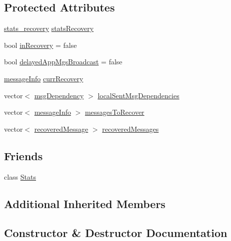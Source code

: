 \subsection*{Protected Attributes}
\begin{DoxyCompactItemize}
\item 
\hyperlink{NodeWithRecovery_8h_a8724f9aa35500c4029d1757428ade746}{stats\+\_\+recovery} \hyperlink{classNodeWithRecovery_abaecd0d1b36ad0305c281905a3465dd6}{stats\+Recovery}
\item 
bool \hyperlink{classNodeWithRecovery_a4e8a29d0f69da296e9971bb5d8882cfb}{in\+Recovery} = false
\item 
bool \hyperlink{classNodeWithRecovery_aae44e6b605047932d21cd5be25671963}{delayed\+App\+Mgs\+Broadcast} = false
\item 
\hyperlink{structures_8h_a7e7bdc1d2fff8a9436f2f352b2711ed6}{message\+Info} \hyperlink{classNodeWithRecovery_a2e574321bd92cb51ef3346168057fe0f}{curr\+Recovery}
\item 
vector$<$ \hyperlink{NodeWithRecovery_8h_a7a7c744666781dbc85c00bb4ccb4a60f}{msg\+Dependency} $>$ \hyperlink{classNodeWithRecovery_a6b143ca2c401bbb2689443091d4d7e17}{local\+Sent\+Msg\+Dependencies}
\item 
vector$<$ \hyperlink{structures_8h_a7e7bdc1d2fff8a9436f2f352b2711ed6}{message\+Info} $>$ \hyperlink{classNodeWithRecovery_a9ed4ac06c68ac579d7848a98b145b5ae}{messages\+To\+Recover}
\item 
vector$<$ \hyperlink{NodeWithRecovery_8h_abc64f7ff8d329883ae93979292b1c996}{recovered\+Message} $>$ \hyperlink{classNodeWithRecovery_adf6b319a727cd9ec43a6cc68cbf99bbb}{recovered\+Messages}
\end{DoxyCompactItemize}
\subsection*{Friends}
\begin{DoxyCompactItemize}
\item 
class \hyperlink{classNodeWithRecovery_a129f65b6976377739eb6231b6962985e}{Stats}
\end{DoxyCompactItemize}
\subsection*{Additional Inherited Members}


\subsection{Constructor \& Destructor Documentation}
\mbox{\label{classNodeWithRecovery_aed1d9b2cfa7729902c90c103ab3075ff}} 
